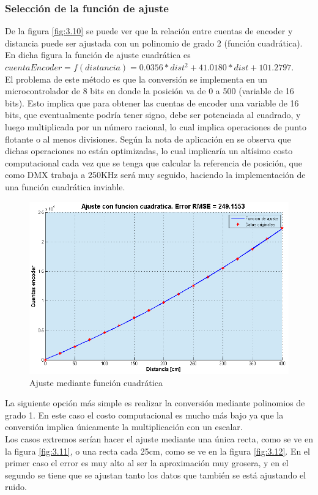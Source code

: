 \subsubsection{Selección de la función de ajuste}
De la figura \ref{fig:3.10} se puede ver que la relación entre cuentas de encoder y distancia puede ser ajustada con un polinomio de grado 2 (función cuadrática). En dicha figura la función de ajuste cuadrática es \(cuentaEncoder = f(distancia) = 0.0356*dist^2 + 41.0180*dist + 101.2797\).\\     
El problema de este método es que la conversión se implementa en un microcontrolador de 8 bits en donde la posición va de 0 a 500 (variable de 16 bits). Esto implica que para obtener las cuentas de encoder una variable de 16 bits, que eventualmente podría tener signo, debe ser potenciada al cuadrado, y luego multiplicada por un número racional, lo cual implica operaciones de punto flotante o al menos divisiones. Según la nota de aplicación en \cite{sec3_3_1} se observa que dichas operaciones no están optimizadas, lo cual implicaría un altísimo costo computacional cada vez que se tenga que calcular la referencia de posición, que como DMX trabaja a 250KHz será muy seguido, haciendo la implementación de una función cuadrática inviable. \\

\begin{figure}[!ht]
	\centering
	\includegraphics[width=15cm,scale=1]{resources/3_10-ajusteCuadratico.png}
	\caption{Ajuste mediante función cuadrática}
	\label{fig:\thefigure}
\end{figure}

La siguiente opción más simple es realizar la conversión mediante polinomios de grado 1. En este caso el costo computacional es mucho más bajo ya que la conversión implica únicamente la multiplicación con un escalar. \\
Los casos extremos serían hacer el ajuste mediante una única recta, como se ve en la figura \ref{fig:3.11}, o una recta cada 25cm, como se ve en la figura \ref{fig:3.12}. En el primer caso el error es muy alto al ser la aproximación muy grosera, y en el segundo se tiene que se ajustan tanto los datos que también se está ajustando el ruido. \\

